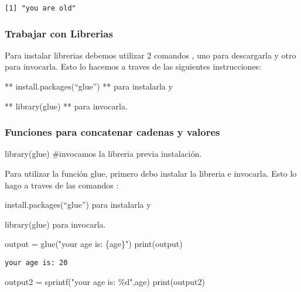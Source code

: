 \documentclass[
  letterpaper,
  DIV=11,
  numbers=noendperiod]{scrartcl}
\newenvironment{Shaded}{\begin{snugshade}}{\end{snugshade}}
\newcommand{\CommentTok}[1]{\textcolor[rgb]{0.37,0.37,0.37}{#1}}
\newcommand{\FunctionTok}[1]{\textcolor[rgb]{0.28,0.35,0.67}{#1}}
\newcommand{\NormalTok}[1]{\textcolor[rgb]{0.00,0.23,0.31}{#1}}
\newcommand{\OtherTok}[1]{\textcolor[rgb]{0.00,0.23,0.31}{#1}}
\newcommand{\StringTok}[1]{\textcolor[rgb]{0.13,0.47,0.30}{#1}}
\begin{document}
\begin{verbatim}
[1] "you are old"
\end{verbatim}

\subsubsection{Trabajar con Librerias}\label{trabajar-con-librerias}

Para instalar librerias debemos utilizar 2 comandos , uno para
descargarla y otro para invocarla. Esto lo hacemos a traves de las
siguientes instrucciones:

** install.packages(``glue'') ** para instalarla y

** library(glue) ** para invocarla.

\subsubsection{Funciones para concatenar cadenas y
valores}\label{funciones-para-concatenar-cadenas-y-valores}

\begin{Shaded}
\begin{Highlighting}[]
\FunctionTok{library}\NormalTok{(glue) }\CommentTok{\#invocamos la libreria previa instalación.}
\end{Highlighting}
\end{Shaded}

Para utilizar la función glue, primero debo instalar la libreria e
invocarla. Esto lo hago a traves de las comandos :

install.packages(``glue'') para instalarla y

library(glue) para invocarla.

\begin{Shaded}
\begin{Highlighting}[]
\NormalTok{output }\OtherTok{=} \FunctionTok{glue}\NormalTok{(}\StringTok{"your age is: \{age\}"}\NormalTok{)}
\FunctionTok{print}\NormalTok{(output)}
\end{Highlighting}
\end{Shaded}

\begin{verbatim}
your age is: 20
\end{verbatim}

\begin{Shaded}
\begin{Highlighting}[]
\NormalTok{output2 }\OtherTok{=} \FunctionTok{sprintf}\NormalTok{(}\StringTok{"your age is: \%d"}\NormalTok{,age)}
\FunctionTok{print}\NormalTok{(output2)}
\end{Highlighting}
\end{Shaded}
\end{document}
